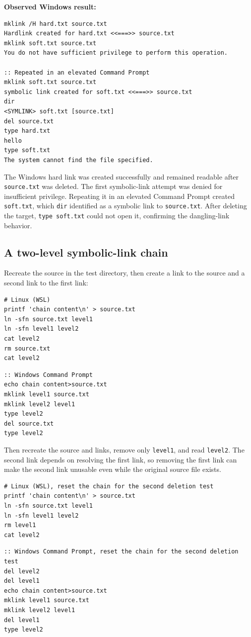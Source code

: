 \documentclass[a4paper,11pt]{article}
\begin{document}
\noindent\textbf{Observed Windows result:}
\begin{lstlisting}
mklink /H hard.txt source.txt
Hardlink created for hard.txt <<===>> source.txt
mklink soft.txt source.txt
You do not have sufficient privilege to perform this operation.

:: Repeated in an elevated Command Prompt
mklink soft.txt source.txt
symbolic link created for soft.txt <<===>> source.txt
dir
<SYMLINK> soft.txt [source.txt]
del source.txt
type hard.txt
hello
type soft.txt
The system cannot find the file specified.
\end{lstlisting}

The Windows hard link was created successfully and remained readable after
\texttt{source.txt} was deleted. The first symbolic-link attempt was denied
for insufficient privilege. Repeating it in an elevated Command Prompt
created \texttt{soft.txt}, which \texttt{dir} identified as a symbolic link to
\texttt{source.txt}. After deleting the target, \texttt{type soft.txt} could
not open it, confirming the dangling-link behavior.

\subsection{A two-level symbolic-link chain}
Recreate the source in the test directory, then create a link to the source
and a second link to the first link:
\begin{lstlisting}
# Linux (WSL)
printf 'chain content\n' > source.txt
ln -sfn source.txt level1
ln -sfn level1 level2
cat level2
rm source.txt
cat level2
\end{lstlisting}
\begin{lstlisting}
:: Windows Command Prompt
echo chain content>source.txt
mklink level1 source.txt
mklink level2 level1
type level2
del source.txt
type level2
\end{lstlisting}

Then recreate the source and links, remove only \texttt{level1}, and read
\texttt{level2}. The second link depends on resolving the first link, so
removing the first link can make the second link unusable even while the
original source file exists.

\begin{lstlisting}
# Linux (WSL), reset the chain for the second deletion test
printf 'chain content\n' > source.txt
ln -sfn source.txt level1
ln -sfn level1 level2
rm level1
cat level2
\end{lstlisting}
\begin{lstlisting}
:: Windows Command Prompt, reset the chain for the second deletion test
del level2
del level1
echo chain content>source.txt
mklink level1 source.txt
mklink level2 level1
del level1
type level2
\end{lstlisting}
\end{document}
